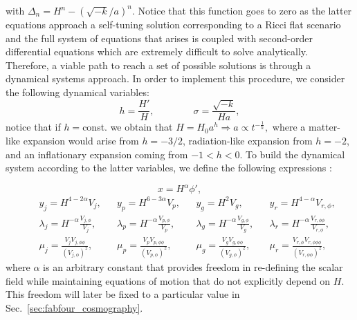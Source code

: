\documentclass[onecolumn,superscriptaddress,secnumarabic,amssymb,amsmath,nobibnotes,aps,prd,nofootinbib,altaffilletter]{revtex4}
\begin{document}
with $  \Delta_n = H^n - (\sqrt{-k} / a)^n$.
Notice that this function goes to zero as the latter equations approach a self-tuning solution corresponding to a Ricci flat scenario and 
the full system of equations that arises is coupled with second-order differential equations which are extremely difficult to solve analytically. 
Therefore, a viable path to reach a set of possible solutions is through a dynamical systems approach\cite{Copeland:2012qf}.
In order to implement
this procedure, we consider the following dynamical variables:
\begin{equation}
    h=\frac{H'}{H}, \qquad \qquad \sigma=\frac{\sqrt{-k}}{Ha},
    \label{eq:hysigma}
\end{equation}
notice that if $h=$const. we obtain that
$    H=H_0 a^h  \Rightarrow  a \propto t^{-\frac{1}{h}},$
where a matter-like expansion would arise from $h=-3/2$, radiation-like expansion from $h=-2$, and an inflationary expansion coming from $-1<h<0$.
To build the dynamical system according to the latter variables, we define the following expressions \cite{Copeland:2012qf}:

\begin{equation}
    x=H^\alpha \phi',
    \label{eq:x}
\end{equation}
\begin{align}
    &&y_j=H^{4-2\alpha}V_j, 
    &&y_p=H^{6-3\alpha}V_p,
    &&y_g=H^{2}V_g, 
    &&y_r=H^{4-\alpha}V_{r,\phi}, 
    \label{eq:ys}\\
    &&\lambda_j=H^{-\alpha}\frac{V_{j,\phi}}{V_j}, 
    &&\lambda_p=H^{-\alpha}\frac{V_{p,\phi}}{V_p}, 
    &&\lambda_g=H^{-\alpha}\frac{V_{g,\phi}}{V_g}, 
    &&\lambda_r=H^{-\alpha}\frac{V_{r,\phi\phi}}{V_{r,\phi}}, 
    \label{eq:lambdas}\\
    &&\mu_j=\frac{V_j V_{j,\phi\phi}}{(V_{j,\phi})^2},
    &&\mu_p=\frac{V_p V_{p,\phi\phi}}{(V_{p,\phi})^2}, 
    &&\mu_g=\frac{V_g V_{g,\phi\phi}}{(V_{g,\phi})^2}, 
    &&\mu_r=\frac{V_{r,\phi} V_{r,\phi\phi\phi}}{(V_{r,\phi\phi})^2},
    \label{eq:mus}
\end{align}
where $\alpha$ is an arbitrary constant that provides freedom in re-defining the scalar field while maintaining equations of motion that do not explicitly depend on $H$. This freedom will later be fixed to a particular value in Sec.~\ref{sec:fabfour_cosmography}.
\end{document}
